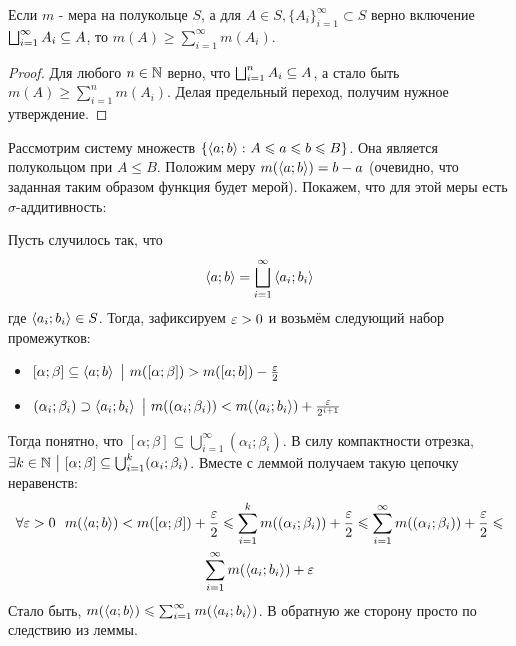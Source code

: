 \begin{corollary}
	Если $m$ - мера на полукольце $S$, а для $A \in S, \{A_i\}_{i = 1}^\infty \subset S$ верно включение $\bigsqcup_{i = 1}^\infty A_i \subseteq A$, то $m(A) \ge \sum_{i = 1}^\infty m(A_i)$.
\end{corollary}

\begin{proof}
	Для любого $n \in \mathbb{N}$ верно, что $\bigsqcup_{i = 1}^n A_i \subseteq A$, а стало быть $m(A) \ge \sum_{i = 1}^n m(A_i)$. Делая предельный переход, получим нужное утверждение.
\end{proof}

\begin{example}
	Рассмотрим систему множеств $\left\{\left\langle a; b\right\rangle \colon A \leqslant a \leqslant b \leqslant B\right\}$. Она является полукольцом при $A \le B$. Положим меру $m(\left\langle a; b\right\rangle) = b - a$ (очевидно, что заданная таким образом функция будет мерой). Покажем, что для этой меры есть $\sigma$-аддитивность:
	
	Пусть случилось так, что
	\[
		\left\langle a; b\right\rangle = \bigsqcup_{i = 1}^\infty \left\langle a_i; b_i\right\rangle
	\]
	где $\left\langle a_i; b_i\right\rangle \in S$. Тогда, зафиксируем $\varepsilon > 0$ и возьмём следующий набор промежутков:
	\begin{itemize}
		\item $[\alpha; \beta] \subseteq \left\langle a; b\right\rangle \ \big|\  m([\alpha; \beta]) > m([a; b]) - \frac{\varepsilon}{2}$
		
		\item $(\alpha_i; \beta_i) \supset \left\langle a_i; b_i\right\rangle \ \big|\  m((\alpha_i; \beta_i)) < m(\left\langle a_i; b_i\right\rangle) + \frac{\varepsilon}{2^{i + 1}}$
	\end{itemize}
	Тогда понятно, что $[\alpha; \beta] \subseteq \bigcup_{i = 1}^\infty (\alpha_i; \beta_i)$. В силу компактности отрезка, $\exists k \in \mathbb{N} \ \big|\  [\alpha; \beta] \subseteq \bigcup_{i = 1}^k (\alpha_i; \beta_i)$. Вместе с леммой получаем такую цепочку неравенств:
	\begin{multline*}
		\forall \varepsilon > 0\ \ m(\left\langle a; b\right\rangle) < m([\alpha; \beta]) + \frac{\varepsilon}{2} \leqslant \sum_{i = 1}^k m((\alpha_i; \beta_i)) + \frac{\varepsilon}{2} \leqslant \sum_{i = 1}^\infty m((\alpha_i; \beta_i)) + \frac{\varepsilon}{2} \leqslant
		\\
		\sum_{i = 1}^\infty m(\left\langle a_i; b_i\right\rangle) + \varepsilon
	\end{multline*}
	Стало быть, $m(\left\langle a; b\right\rangle) \leqslant \sum_{i = 1}^\infty m(\left\langle a_i; b_i\right\rangle)$. В обратную же сторону просто по следствию из леммы.
\end{example}